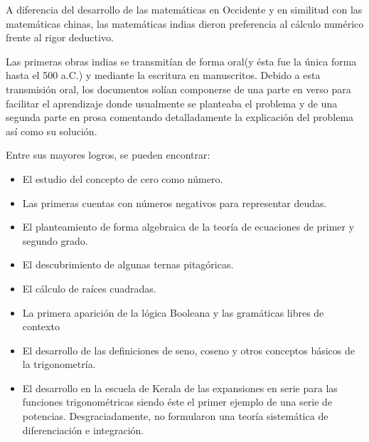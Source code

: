 \documentclass[a4paper, 11pt]{article}
\begin{document}
	A diferencia del desarrollo de las matemáticas en Occidente y en similitud con las matemáticas chinas, las matemáticas
	indias dieron preferencia al cálculo numérico frente al rigor deductivo.

	Las primeras obras indias se transmitían de forma oral(y ésta fue la única forma hasta el 500 a.C.) y mediante la
	escritura en manuscritos. Debido a esta transmisión oral, los documentos solían componerse de una parte en verso
	para facilitar el aprendizaje donde usualmente se planteaba el problema y de una segunda parte en prosa comentando
	detalladamente la explicación del problema así como su solución.
	
	Entre sus mayores logros, se pueden encontrar:
	\begin{itemize}
		\item El estudio del concepto de cero como número.
		\item Las primeras cuentas con números negativos para representar deudas.
		\item El planteamiento de forma algebraica de la teoría de ecuaciones de primer y segundo grado.
		\item El descubrimiento de algunas ternas pitagóricas.
		\item El cálculo de raíces cuadradas.
		\item La primera aparición de la lógica Booleana y las gramáticas libres de contexto
		\item El desarrollo de las definiciones de seno, coseno y otros conceptos básicos de la trigonometría.
		\item El desarrollo en la escuela de Kerala de las expansiones en serie para las funciones trigonométricas siendo
		éste el primer ejemplo de una serie de potencias. Desgraciadamente, no formularon una teoría sistemática de
		diferenciación e integración.
	\end{itemize}
\end{document}
